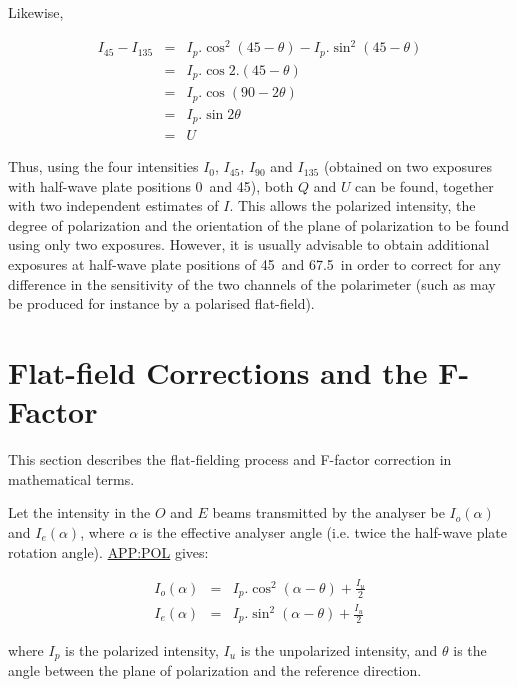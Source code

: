 Likewise,
\begin{myquote}
\begin{eqnarray*}
  I_{45} - I_{135} & = & I_{p}.\cos^{2}(45 - \theta) - I_{p}.\sin^{2}(45 - \theta) \\
                   & = & I_{p}.\cos 2.(45 - \theta) \\
                   & = & I_{p}.\cos (90 - 2\theta) \\
                   & = & I_{p}.\sin 2\theta \\
                   & = & U
\end{eqnarray*}
\end{myquote}

Thus, using the four intensities $I_{0}$, $I_{45}$, $I_{90}$ and $I_{135}$
(obtained on two exposures with half-wave plate positions 0\dgs\ and
45\dgs), both $Q$ and $U$ can be found, together with two
independent estimates of $I$. This allows the polarized intensity, the
degree of polarization and the orientation of the plane of polarization to
be found using only two exposures. However, it is usually advisable to
obtain additional exposures at half-wave plate positions of 45\dgs\ and
67.5\dgs\ in order to correct for any difference in the sensitivity of
the two channels of the polarimeter (such as may be produced for instance
by a polarised flat-field).

\section{\label{APP:FFCOR}Flat-field
          Corrections and the F-Factor}
This section describes the flat-fielding process and F-factor correction
in mathematical terms.

Let the intensity in the $O$ and $E$ beams transmitted by the analyser be
$I_{o}(\alpha)$ and $I_{e}(\alpha)$, where $\alpha$ is the effective 
analyser angle (i.e. twice the half-wave plate rotation angle).
\hyperref{Malus' law}{Malus' law (see appendix }{)}{APP:POL} gives:

\begin{myquote}
\begin{eqnarray*}
  I_{o}(\alpha) & = & I_{p}.\cos^{2}( \alpha - \theta ) + \frac{I_{u}}{2} \\
  I_{e}(\alpha) & = & I_{p}.\sin^{2}( \alpha - \theta ) + \frac{I_{u}}{2} 
\end{eqnarray*}
\end{myquote}

where $I_{p}$ is the polarized intensity, $I_{u}$ is the unpolarized
intensity, and $\theta$ is the angle between the plane of polarization
and the reference direction. 


